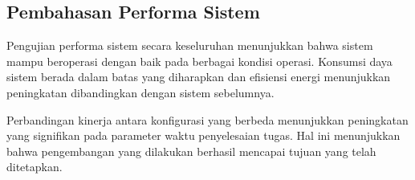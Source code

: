 
\subsection{Pembahasan Performa Sistem}

Pengujian performa sistem secara keseluruhan menunjukkan bahwa sistem mampu beroperasi dengan baik pada berbagai kondisi operasi. Konsumsi daya sistem berada dalam batas yang diharapkan dan efisiensi energi menunjukkan peningkatan dibandingkan dengan sistem sebelumnya.

Perbandingan kinerja antara konfigurasi yang berbeda menunjukkan peningkatan yang signifikan pada parameter waktu penyelesaian tugas. Hal ini menunjukkan bahwa pengembangan yang dilakukan berhasil mencapai tujuan yang telah ditetapkan.
